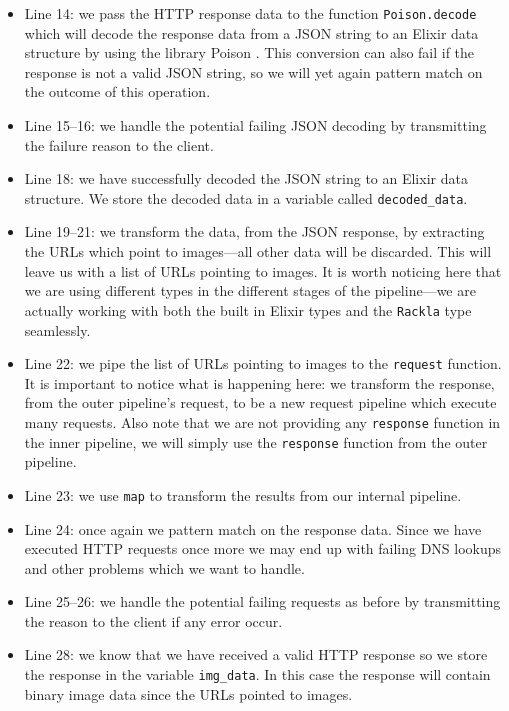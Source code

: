 \documentclass{cslthse-msc}
\begin{document}
\begin{itemize}
\item Line 14: we pass the HTTP response data to the function \lstinline{Poison.decode} which will decode the response data from a JSON string to an Elixir data structure by using the library Poison \cite{poison}. This conversion can also fail if the response is not a valid JSON string, so we will yet again pattern match on the outcome of this operation.

\item Line 15--16: we handle the potential failing JSON decoding by transmitting the failure reason to the client.

\item Line 18: we have successfully decoded the JSON string to an Elixir data structure. We store the decoded data in a variable called \lstinline{decoded_data}.

\item Line 19--21: we transform the data, from the JSON response, by extracting the URLs which point to images---all other data will be discarded. This will leave us with a list of URLs pointing to images. It is worth noticing here that we are using different types in the different stages of the pipeline---we are actually working with both the built in Elixir types and the \lstinline{Rackla} type seamlessly.

\item Line 22: we pipe the list of URLs pointing to images to the \lstinline{request} function. It is important to notice what is happening here: we transform the response, from the outer pipeline's request, to be a new request pipeline which execute many requests. Also note that we are not providing any \lstinline{response} function in the inner pipeline, we will simply use the \lstinline{response} function from the outer pipeline.

\item Line 23: we use \lstinline{map} to transform the results from our internal pipeline.

\item Line 24: once again we pattern match on the response data. Since we have executed HTTP requests once more we may end up with failing DNS lookups and other problems which we want to handle.

\item Line 25--26: we handle the potential failing requests as before by transmitting the reason to the client if any error occur.

\item Line 28: we know that we have received a valid HTTP response so we store the response in the variable \lstinline{img_data}. In this case the response will contain binary image data since the URLs pointed to images.


\end{itemize}
\end{document}
